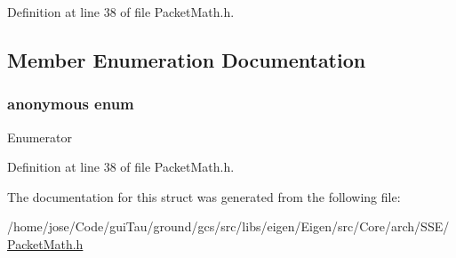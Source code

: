 Definition at line 38 of file Packet\-Math.\-h.



\subsection{Member Enumeration Documentation}
\hypertarget{structei__unpacket__traits_3_01____m128i_01_4_a3eff71c475feba70f4b391ff2f6314a1}{\subsubsection[{anonymous enum}]{\setlength{\rightskip}{0pt plus 5cm}anonymous enum}}\label{structei__unpacket__traits_3_01____m128i_01_4_a3eff71c475feba70f4b391ff2f6314a1}
\begin{Desc}
\item[Enumerator]\par
\begin{description}
\item[{\em 
\hypertarget{structei__unpacket__traits_3_01____m128i_01_4_a3eff71c475feba70f4b391ff2f6314a1a7cdffa5be4818a4ff974975601b253c4}{size}\label{structei__unpacket__traits_3_01____m128i_01_4_a3eff71c475feba70f4b391ff2f6314a1a7cdffa5be4818a4ff974975601b253c4}
}]\end{description}
\end{Desc}


Definition at line 38 of file Packet\-Math.\-h.



The documentation for this struct was generated from the following file\-:\begin{DoxyCompactItemize}
\item 
/home/jose/\-Code/gui\-Tau/ground/gcs/src/libs/eigen/\-Eigen/src/\-Core/arch/\-S\-S\-E/\hyperlink{_s_s_e_2_packet_math_8h}{Packet\-Math.\-h}\end{DoxyCompactItemize}
